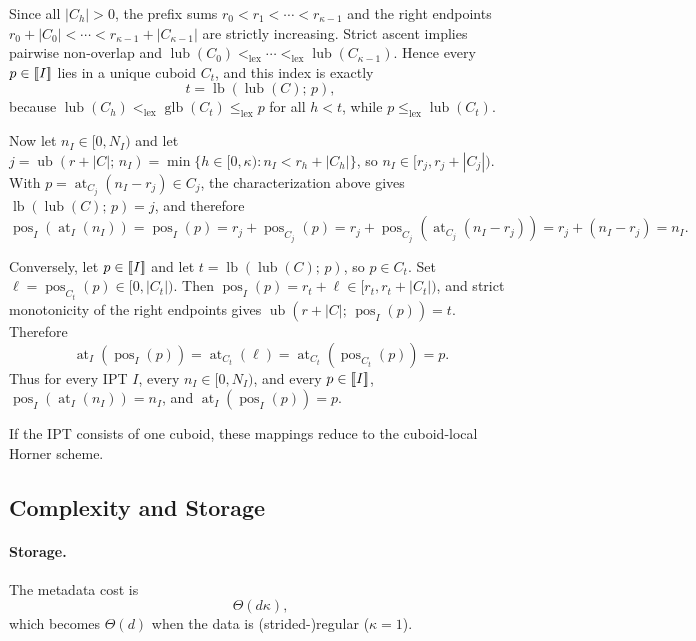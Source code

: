 \documentclass[manuscript,screen,review]{acmart}
\newcommand{\llbracket}{\mathopen{[\mkern-3mu[}}
\newcommand{\rrbracket}{\mathclose{]\mkern-3mu]}}
\theoremstyle{definition}
\theoremstyle{plain}
\begin{document}
Since all $|C_h|>0$, the prefix sums $r_0 < r_1 < \cdots < r_{\kappa-1}$ and the right endpoints $r_0+|C_0| < \cdots < r_{\kappa-1}+|C_{\kappa-1}|$ are strictly increasing. Strict ascent implies pairwise non-overlap and $\operatorname{lub}(C_0) <_{\mathrm{lex}} \cdots <_{\mathrm{lex}} \operatorname{lub}(C_{\kappa-1})$. Hence every $p \in \llbracket I \rrbracket$ lies in a unique cuboid $C_t$, and this index is exactly
\[
  t = \operatorname{lb}(\operatorname{lub}(C);\,p),
\]
because $\operatorname{lub}(C_h) <_{\mathrm{lex}} \operatorname{glb}(C_t) \le_{\mathrm{lex}} p$ for all $h < t$, while $p \le_{\mathrm{lex}} \operatorname{lub}(C_t)$.

Now let $n_I \in [0,N_I)$ and let
$
  j = \operatorname{ub}(r{+}|C|;\,n_I) = \min\{h \in [0,\kappa) : n_I < r_h + |C_h|\}$,
so $n_I \in [r_j, r_j + |C_j|)$. With $p = \operatorname{at}_{C_j}(n_I-r_j) \in C_j$, the characterization above gives $\operatorname{lb}(\operatorname{lub}(C);\,p)=j$, and therefore
\[
  \operatorname{pos}_I(\operatorname{at}_I(n_I)) = \operatorname{pos}_I(p)
  = r_j + \operatorname{pos}_{C_j}(p)
  = r_j + \operatorname{pos}_{C_j}(\operatorname{at}_{C_j}(n_I-r_j))
  = r_j + (n_I-r_j)
  = n_I.
\]

Conversely, let $p \in \llbracket I \rrbracket$ and let $t = \operatorname{lb}(\operatorname{lub}(C);\,p)$, so $p \in C_t$. Set $\ell = \operatorname{pos}_{C_t}(p) \in [0,|C_t|)$. Then
$
  \operatorname{pos}_I(p) = r_t + \ell \in [r_t, r_t + |C_t|)$,
and strict monotonicity of the right endpoints gives $\operatorname{ub}(r{+}|C|;\,\operatorname{pos}_I(p))=t$. Therefore
\[
  \operatorname{at}_I(\operatorname{pos}_I(p))
  = \operatorname{at}_{C_t}(\ell)
  = \operatorname{at}_{C_t}(\operatorname{pos}_{C_t}(p))
  = p.
\]
Thus for every IPT $I$, every $n_I \in [0,N_I)$, and every $p \in \llbracket I \rrbracket$,
$
  \operatorname{pos}_I(\operatorname{at}_I(n_I)) = n_I$,
  and   $\operatorname{at}_I(\operatorname{pos}_I(p)) = p
$.

If the IPT consists of one cuboid, these mappings reduce to the cuboid-local Horner scheme.

\subsection{Complexity and Storage}

\paragraph{Storage.}
The metadata cost is
\[
  \Theta(d\kappa),
\]
which becomes $\Theta(d)$ when the data is (strided-)regular ($\kappa=1$).
\end{document}
